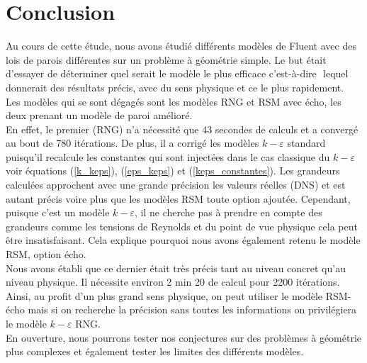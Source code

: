 \documentclass[a4paper,10pt]{article}
\newcommand{\cad}{c'est-à-dire }
\newcommand{\keps}{$k-\varepsilon$}
\newcommand\black{\color{black}}
\begin{document}
 \section*{Conclusion} \black
Au cours de cette étude, nous avons étudié différents modèles de Fluent avec des lois de parois différentes sur un problème à géométrie simple. Le but était d'essayer de déterminer quel serait le modèle le plus efficace \cad $ $ lequel donnerait des résultats précis, avec du sens physique et ce le plus rapidement. \\
Les modèles qui se sont dégagés sont les modèles RNG et RSM avec écho, les deux prenant un modèle de paroi amélioré. \\
En effet, le premier (RNG) n'a nécessité que 43 secondes de calculs et a convergé au bout de 780 itérations. De plus, il a corrigé les modèles \keps$ $ standard puisqu'il recalcule les constantes qui sont injectées dans le cas classique du \keps $ $ voir équations (\ref{k_keps}), (\ref{eps_keps}) et (\ref{keps_constantes}). Les grandeurs calculées approchent avec une grande précision les valeurs réelles (DNS) et est autant précis voire plus que les modèles RSM toute option ajoutée. 
Cependant, puisque c'est un modèle \keps$ $, il ne cherche pas à prendre en compte des grandeurs comme les tensions de Reynolds et du point de vue physique cela peut être insatisfaisant. Cela explique pourquoi nous avons également retenu le modèle RSM, option écho. \\
Nous avons établi que ce dernier  était très précis tant au niveau concret qu'au niveau physique. Il nécessite environ 2 min 20 de calcul pour 2200 itérations.
Ainsi, au profit d'un plus grand sens physique, on peut utiliser le modèle RSM-écho mais si on recherche la précision sans toutes les informations on privilégiera le modèle \keps $ $ RNG.\\
En ouverture, nous pourrons tester nos conjectures sur des problèmes à géométrie plus complexes et également tester les limites des différents modèles.
 
\end{document}
